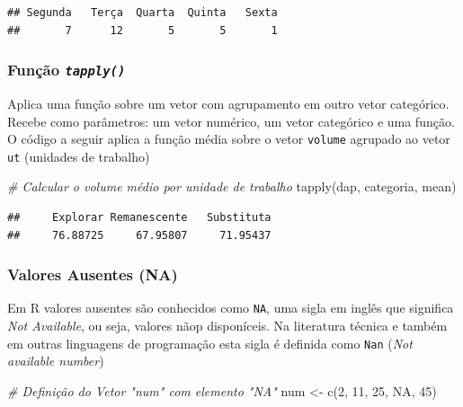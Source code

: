 \documentclass[
]{article}
\newenvironment{Shaded}{\begin{snugshade}}{\end{snugshade}}
\newcommand{\CommentTok}[1]{\textcolor[rgb]{0.56,0.35,0.01}{\textit{#1}}}
\newcommand{\ConstantTok}[1]{\textcolor[rgb]{0.00,0.00,0.00}{#1}}
\newcommand{\DecValTok}[1]{\textcolor[rgb]{0.00,0.00,0.81}{#1}}
\newcommand{\FunctionTok}[1]{\textcolor[rgb]{0.00,0.00,0.00}{#1}}
\newcommand{\NormalTok}[1]{#1}
\newcommand{\OtherTok}[1]{\textcolor[rgb]{0.56,0.35,0.01}{#1}}
\begin{document}
\begin{verbatim}
## Segunda   Terça  Quarta  Quinta   Sexta 
##       7      12       5       5       1
\end{verbatim}

\hypertarget{funuxe7uxe3o-tapply}{%
\subsubsection{\texorpdfstring{Função
\emph{\texttt{tapply()}}}{Função tapply()}}\label{funuxe7uxe3o-tapply}}

Aplica uma função sobre um vetor com agrupamento em outro vetor
categórico. Recebe como parâmetros: um vetor numérico, um vetor
categórico e uma função. O código a seguir aplica a função média sobre o
vetor \texttt{volume} agrupado ao vetor \texttt{ut} (unidades de
trabalho)

\begin{Shaded}
\begin{Highlighting}[]
\CommentTok{\# Calcular o volume médio por unidade de trabalho}
\FunctionTok{tapply}\NormalTok{(dap, categoria, mean)}
\end{Highlighting}
\end{Shaded}

\begin{verbatim}
##     Explorar Remanescente   Substituta 
##     76.88725     67.95807     71.95437
\end{verbatim}

\hypertarget{valores-ausentes-na}{%
\subsubsection{Valores Ausentes (NA)}\label{valores-ausentes-na}}

Em R valores ausentes são conhecidos como \texttt{NA}, uma sigla em
inglês que significa \emph{Not Available}, ou seja, valores nãop
disponíceis. Na literatura técnica e também em outras linguagens de
programação esta sigla é definida como \texttt{Nan} (\emph{Not available
number})

\begin{Shaded}
\begin{Highlighting}[]
\CommentTok{\# Definição do Vetor "num" com elemento "NA"}
\NormalTok{num }\OtherTok{\textless{}{-}} \FunctionTok{c}\NormalTok{(}\DecValTok{2}\NormalTok{, }\DecValTok{11}\NormalTok{, }\DecValTok{25}\NormalTok{, }\ConstantTok{NA}\NormalTok{, }\DecValTok{45}\NormalTok{)}
\end{Highlighting}
\end{Shaded}
\end{document}
